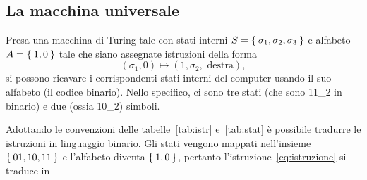		\subsection{La macchina universale}
Presa una macchina di Turing tale con stati interni $S=\Set{\sigma_1, \sigma_2, \sigma_3}$ e alfabeto $A=\Set{1, 0}$ tale che siano assegnate istruzioni della forma
\begin{equation}\label{eq:istruzione}
(\sigma_1, 0) \mapsto (1, \sigma_2, \text{ destra}),	%
\end{equation}
si possono ricavare i corrispondenti stati interni del computer usando il suo alfabeto (il codice binario).
Nello specifico, ci sono tre stati  (che sono \num[parse-numbers=false]{11_2} in binario) e due (ossia \num[parse-numbers=false]{10_2}) simboli.
\begin{table}
	\centering
{}\qquad
\subfloat[][{Stati interni.}\label{tab:stat}]{%
	\begin{tabular}{l S[parse-numbers=false]}
		\toprule
\emph{Stato}			&{\emph{Numero}}	\\
		\midrule
$\sigma_1$				&01	\\
$\sigma_2$				&10	\\
$\sigma_3$				&11	\\
		\bottomrule
	\end{tabular}
}
	\caption[Macchina di Turing]{Convenzioni binarie per la macchina di Turing.}
\end{table}
Adottando le convenzioni delle tabelle~\ref{tab:istr} e~\ref{tab:stat} è possibile tradurre le istruzioni in linguaggio binario.
Gli stati vengono mappati nell'insieme $\Set{01,10,11}$ e l'alfabeto diventa $\Set{1,0}$, pertanto l'istruzione~\eqref{eq:istruzione} si traduce in
